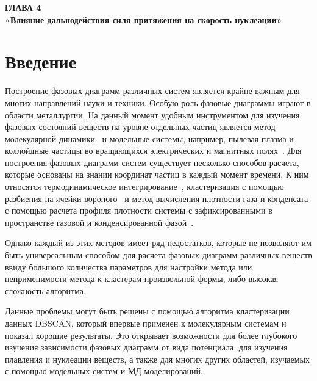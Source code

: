 
\newpage
\begin{center}
\textbf{\large ГЛАВА 4 \\ «Влияние дальнодействия силя притяжения на скорость нуклеации»}
\end{center}


\section{Введение}
\label{PRIMe-SecIntroduction}

Построение фазовых диаграмм различных систем является крайне важным для многих направлений науки и техники.
Особую роль фазовые диаграммы играют в области металлургии.
На данный момент удобным инструментом для изучения фазовых состояний веществ на уровне отдельных частиц является метод молекулярной динамики~\cite{10.1063/1.1730376, 10.1006/jcph.1995.1039} и модельные системы, например, пылевая плазма и коллойдные частицы во вращающихся электрических и магнитных полях~\cite{10.1038/s41598-017-14001-y, 10.1103/physreve.103.022608, 10.1103/physreve.96.043201}.
Для построения фазовых диаграмм систем существует несколько способов расчета, которые основаны на знании координат частиц в каждый момент времени.
К ним относятся термодинамическое интегрирование~\cite{10.1088/0953-8984/21/46/465104}, кластеризация с помощью разбиения на ячейки вороного~\cite{10.1021/acs.jpcc.7b09317} и метод вычисления плотности газа и конденсата с помощью расчета профиля плотности системы с зафиксированными в пространстве газовой и конденсированной фазой~\cite{10.1021/jp806127j, 10.1021/jp1117213}.

Однако каждый из этих методов имеет ряд недостатков, которые не позволяют им быть универсальным способом для расчета фазовых диаграмм различных веществ ввиду большого количества параметров для настройки метода или неприменимости метода к кластерам произвольной формы, либо высокая сложность алгоритма.

Данные проблемы могут быть решены с помощью алгоритма кластеризации данных DBSCAN, который впервые применен к молекулярным системам и показал хорошие результаты.
Это открывает возможности для более глубокого изучения зависимости фазовых диаграмм от вида потенциала, для изучения плавления и нуклеации веществ, а также для многих других областей, изучаемых с помощью модельных систем и МД моделирований.


